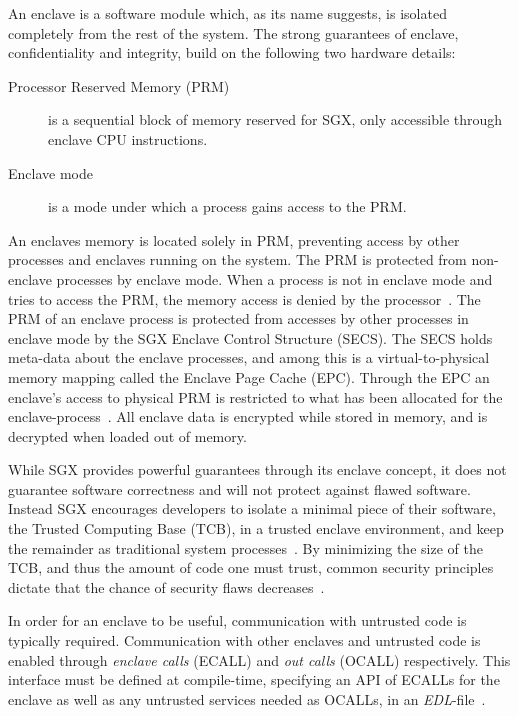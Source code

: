 \documentclass{article}
\begin{document}
			An enclave is a software module which, as its name suggests, is isolated completely from the rest of the system.
			The strong guarantees of enclave, confidentiality and integrity, build on the following two hardware details:
			\begin{description}
				\item [Processor Reserved Memory (PRM)] is a sequential block of memory reserved for SGX, only accessible through enclave CPU instructions.
				\item [Enclave mode] is a mode under which a process gains access to the PRM.
			\end{description}
			An enclaves memory is located solely in PRM, preventing access by other processes and enclaves running on the system.
			The PRM is protected from non-enclave processes by enclave mode.
			When a process is not in enclave mode and tries to access the PRM, the memory access is denied by the processor~\cite{costan_intel_2016}.
			The PRM of an enclave process is protected from accesses by other processes in enclave mode by the SGX Enclave Control Structure (SECS).
			The SECS holds meta-data about the enclave processes, and among this is a virtual-to-physical memory mapping called the Enclave Page Cache (EPC).
			Through the EPC an enclave's access to physical PRM is restricted to what has been allocated for the enclave-process~\cite{costan_intel_2016}.
			All enclave data is encrypted while stored in memory, and is decrypted when loaded out of memory.

			While SGX provides powerful guarantees through its enclave concept, it does not guarantee software correctness and will not protect against flawed software.
			Instead SGX encourages developers to isolate a minimal piece of their software, the Trusted Computing Base (TCB), in a trusted enclave environment, and keep the remainder as traditional system processes~\cite{intel_sgx_guide}.
			By minimizing the size of the TCB, and thus the amount of code one must trust, common security principles dictate that the chance of security flaws decreases~\cite{intel_sgx_guide}.

			In order for an enclave to be useful, communication with untrusted code is typically required.
			Communication with other enclaves and untrusted code is enabled through \textit{enclave calls} (ECALL) and \textit{out calls} (OCALL) respectively.
			This interface must be defined at compile-time, specifying an API of ECALLs for the enclave as well as any untrusted services needed as OCALLs, in an \textit{EDL}-file~\cite{intel_sgx_guide}.
\end{document}
